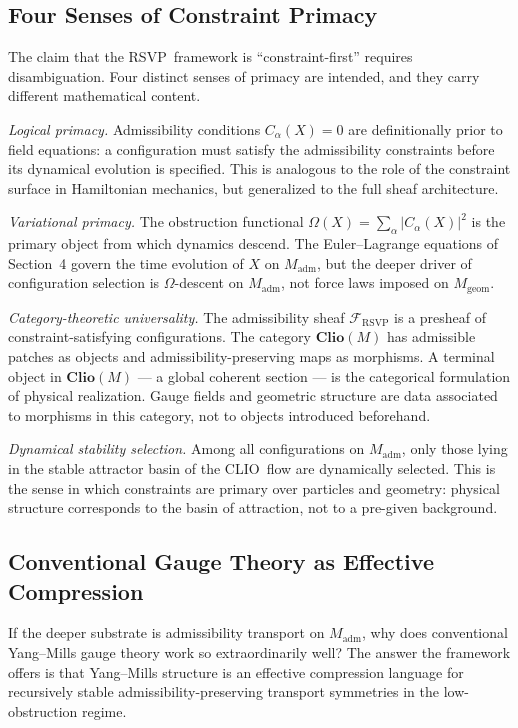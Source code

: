 \documentclass[12pt,a4paper]{article}
\newcommand{\RSVP}{\textrm{RSVP}}
\newcommand{\CLIO}{\textrm{CLIO}}
\newcommand{\Sheaf}{\mathcal{F}}
\begin{document}
\subsection{Four Senses of Constraint Primacy}

The claim that the \RSVP\ framework is ``constraint-first'' requires
disambiguation. Four distinct senses of primacy are intended, and they carry
different mathematical content.

\textit{Logical primacy.} Admissibility conditions $C_\alpha(X)=0$ are
definitionally prior to field equations: a configuration must satisfy the
admissibility constraints before its dynamical evolution is specified. This is
analogous to the role of the constraint surface in Hamiltonian mechanics, but
generalized to the full sheaf architecture.

\textit{Variational primacy.} The obstruction functional $\Omega(X)=\sum_\alpha
|C_\alpha(X)|^2$ is the primary object from which dynamics descend. The
Euler--Lagrange equations of Section~4 govern the time evolution of $X$ on
$M_\mathrm{adm}$, but the deeper driver of configuration selection is
$\Omega$-descent on $M_\mathrm{adm}$, not force laws imposed on $M_\mathrm{geom}$.

\textit{Category-theoretic universality.} The admissibility sheaf $\Sheaf_\RSVP$
is a presheaf of constraint-satisfying configurations. The category
$\mathbf{Clio}(M)$ has admissible patches as objects and admissibility-preserving
maps as morphisms. A terminal object in $\mathbf{Clio}(M)$ --- a global coherent
section --- is the categorical formulation of physical realization. Gauge fields
and geometric structure are data associated to morphisms in this category, not
to objects introduced beforehand.

\textit{Dynamical stability selection.} Among all configurations on
$M_\mathrm{adm}$, only those lying in the stable attractor basin of the \CLIO\
flow are dynamically selected. This is the sense in which constraints are
primary over particles and geometry: physical structure corresponds to the
basin of attraction, not to a pre-given background.

\subsection{Conventional Gauge Theory as Effective Compression}

If the deeper substrate is admissibility transport on $M_\mathrm{adm}$, why
does conventional Yang--Mills gauge theory work so extraordinarily well? The
answer the framework offers is that Yang--Mills structure is an effective
compression language for recursively stable admissibility-preserving transport
symmetries in the low-obstruction regime.
\end{document}
